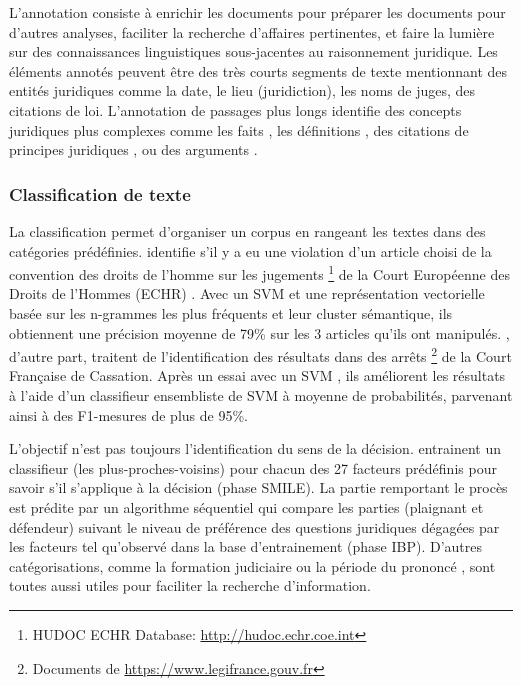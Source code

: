 L'annotation consiste à enrichir les documents pour préparer les documents pour d'autres analyses, faciliter la recherche d'affaires pertinentes, et faire la lumière sur des connaissances linguistiques sous-jacentes au raisonnement juridique. Les éléments annotés peuvent être des très courts segments de texte mentionnant des entités juridiques \citep{Waltl2016lexia, wyner2010extractlegalelts} comme la date, le lieu (juridiction), les noms de juges, des citations de loi.  L'annotation de passages plus longs identifie des concepts juridiques plus complexes comme les faits \citep{wyner2010extractlegalelts, Wyner2010extractcasefactor, Shulayeva2017recognfactprincip}, les définitions \citep{Waltl2016lexia}, des citations de principes juridiques \citep{Shulayeva2017recognfactprincip}, ou des arguments \citep{WynerMoens2010mineargument}.


\subsubsection{Classification de texte}
La classification permet d'organiser un corpus en rangeant les textes dans des catégories prédéfinies.  \citep{Aletras2016predictDecisionECHR} identifie s'il y a eu une violation d'un article choisi de la convention des droits de l'homme sur les jugements \footnote{HUDOC ECHR Database: \url{http://hudoc.echr.coe.int}} de la Court Européenne des Droits de l'Hommes (ECHR) . Avec un SVM et une représentation vectorielle basée sur les n-grammes les plus fréquents et leur cluster sémantique, ils obtiennent une précision moyenne de 79\% sur les 3 articles qu'ils ont manipulés. \cite{sulea2017legalEnsSVM}, d'autre part, traitent de l'identification des résultats dans des arrêts \footnote{Documents de \url{https://www.legifrance.gouv.fr}} de la Court Française de Cassation. Après un essai avec un SVM \citep{Sulea2017predictareadecision}, ils améliorent les résultats à l'aide d'un classifieur ensembliste de SVM à moyenne de probabilités, parvenant ainsi à des F1-mesures de plus de 95\%. 

L'objectif n'est pas toujours l'identification du sens de la décision. \cite{Ashley2009classifCases} entrainent un classifieur (les plus-proches-voisins) pour chacun des 27 facteurs prédéfinis pour savoir s'il s'applique à la décision (phase SMILE). La partie remportant le procès est prédite par un algorithme séquentiel qui compare les parties (plaignant et défendeur) suivant le niveau de préférence des questions juridiques dégagées par les facteurs tel qu'observé dans la base d'entrainement (phase IBP).  D'autres catégorisations, comme la formation judiciaire ou la période du prononcé \citep{Sulea2017predictareadecision,sulea2017legalEnsSVM}, sont toutes aussi utiles pour faciliter la recherche d'information.

